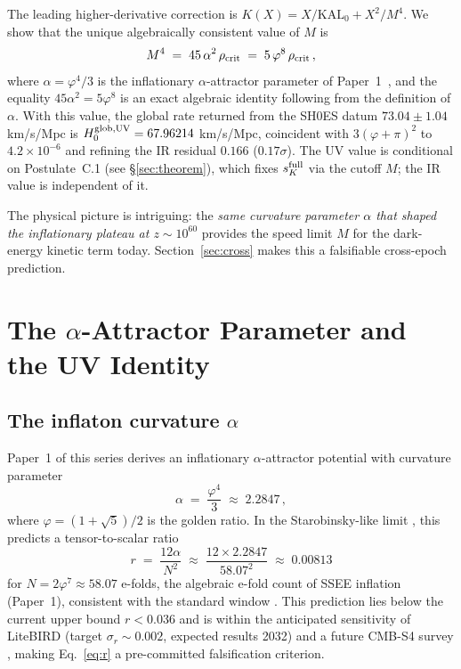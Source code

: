 \documentclass[12pt,a4paper]{article}
\newcommand{\phiG}{\varphi}
\newcommand{\KAL}{\mathrm{KAL}_0}
\newcommand{\sK}{s_K}
\newcommand{\rhoc}{\rho_{\rm crit}}
\begin{document}
The leading higher-derivative correction is $K(X) = X/\KAL + X^2/M^4$.
We show that the unique algebraically consistent value of $M$ is
\begin{equation}
  M^4 \;=\; 45\,\alpha^2\,\rhoc \;=\; 5\,\phiG^8\,\rhoc\,,
  \label{eq:M4main}
\end{equation}
where $\alpha = \phiG^4/3$ is the inflationary $\alpha$-attractor parameter of
Paper~1~\citep{SSEE1}, and the equality $45\alpha^2 = 5\phiG^8$ is an exact algebraic identity
following from the definition of $\alpha$.
With this value, the global rate returned from the SH0ES datum
$73.04\pm1.04$ km/s/Mpc \citep{Riess2022} is
$H_0^{\rm glob,UV} = 67.96214$ km/s/Mpc, coincident with $3(\phiG+\pi)^2$ to
$4.2\times10^{-6}$ and refining the IR residual $0.166$ ($0.17\sigma$). The UV value
is conditional on Postulate~C.1 (see §\ref{sec:theorem}), which fixes
$\sK^{\rm full}$ via the cutoff $M$; the IR value is independent of it.

The physical picture is intriguing: the \emph{same curvature parameter $\alpha$
that shaped the inflationary plateau at $z \sim 10^{60}$} provides the speed
limit $M$ for the dark-energy kinetic term today.
Section~\ref{sec:cross} makes this a falsifiable cross-epoch prediction.


\section{The $\alpha$-Attractor Parameter and the UV Identity}
\label{sec:alpha}

\subsection{The inflaton curvature $\alpha$}

Paper~1 of this series derives an inflationary $\alpha$-attractor potential
with curvature parameter
\begin{equation}
  \alpha \;=\; \frac{\phiG^4}{3}
         \;\approx\; 2.2847\,,
  \label{eq:alpha}
\end{equation}
where $\phiG = (1+\sqrt{5})/2$ is the golden ratio.
In the Starobinsky-like limit \citep{Starobinsky1980,Kallosh2013,Galante2015}, this predicts a tensor-to-scalar ratio
\begin{equation}
  r \;=\; \frac{12\alpha}{N^2}
    \;\approx\; \frac{12 \times 2.2847}{58.07^2}
    \;\approx\; 0.00813
  \label{eq:r}
\end{equation}
for $N = 2\varphi^7 \approx 58.07$ e-folds, the algebraic e-fold count of
SSEE inflation (Paper~1), consistent with the standard window \citep{LiddleLeach2003}.
This prediction lies below the current upper bound $r < 0.036$
\citep{Akrami2020} and is within the anticipated sensitivity of LiteBIRD
\citep{LiteBIRD2020} (target $\sigma_r \sim 0.002$, expected results 2032)
and a future CMB-S4 survey \citep{CMBS4_2016}, making
Eq.~\eqref{eq:r} a pre-committed falsification criterion.
\end{document}
